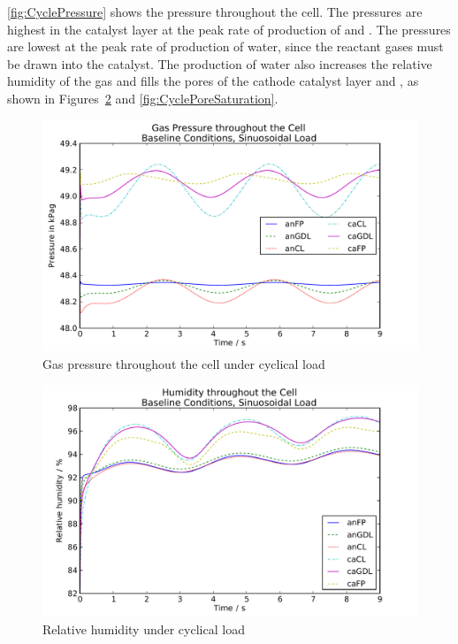 \autoref{fig:CyclePressure} shows the pressure throughout the cell.  The pressures are highest in the catalyst layer at the peak rate of production of  and .  The pressures are lowest at the peak rate of production of water, since the reactant gases must be drawn into the catalyst.  The production of water also increases the relative humidity of the gas and fills the pores of the cathode catalyst layer and , as shown in Figures~\ref{fig:CycleHumidity} and \ref{fig:CyclePoreSaturation}.

\begin{figure}[htbp]
  \includegraphics[width=\linewidth]{Results/Cell/Model/Cycle/PressureGas}%
  \caption{Gas pressure throughout the cell under cyclical load}%
  \label{fig:CyclePressure}
\end{figure}

\begin{figure}[htbp]
  \includegraphics[width=\linewidth]{Results/Cell/Model/Cycle/Humidity}
  \caption{Relative humidity under cyclical load}%
  \label{fig:CycleHumidity}
\end{figure}

